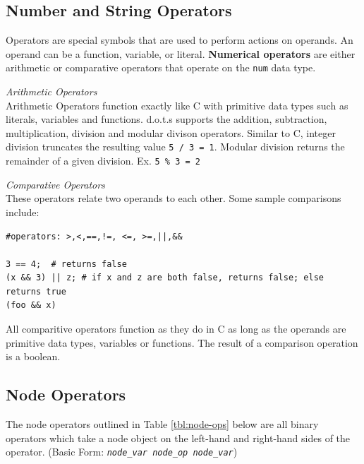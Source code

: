 \documentclass{article}
\newcommand{\code}[1]{\texttt{#1}} %
\begin{document}
\subsection{Number and String Operators}

Operators are special symbols that are used to perform actions on operands. An operand can be a function, variable, or literal.
\textbf{Numerical operators} are either arithmetic or comparative operators that operate on the \code{num} data type.

\emph{Arithmetic Operators} \\
Arithmetic Operators function exactly like C with primitive data types such as literals,  variables and functions. d.o.t.s supports the addition, subtraction, multiplication, division and modular divison operators. Similar to C, integer division truncates the resulting value \code {5 / 3 = 1}. Modular division returns the remainder of a given division. Ex. \code {5 \% 3 = 2} 

\emph{Comparative Operators} \\
These operators relate two operands to each other. Some sample comparisons include: 
\begin{lstlisting}[language=pltLang, caption=Declaration of ``string'' types., label=lst:ops]
#operators: >,<,==,!=, <=, >=,||,&&

3 == 4;  # returns false
(x && 3) || z; # if x and z are both false, returns false; else returns true
(foo && x)
\end{lstlisting}

All comparitive operators function as they do in C as long as the operands are primitive data types, variables or functions. The result of a comparison operation is a boolean. 

\subsection{Node Operators}

The node operators outlined in Table \ref{tbl:node-ops} below are all binary operators which take a node object on the left-hand and right-hand sides of the operator.  (Basic Form: \code{\emph{node\_var} \emph{node\_op} \emph{node\_var}})
\end{document}
